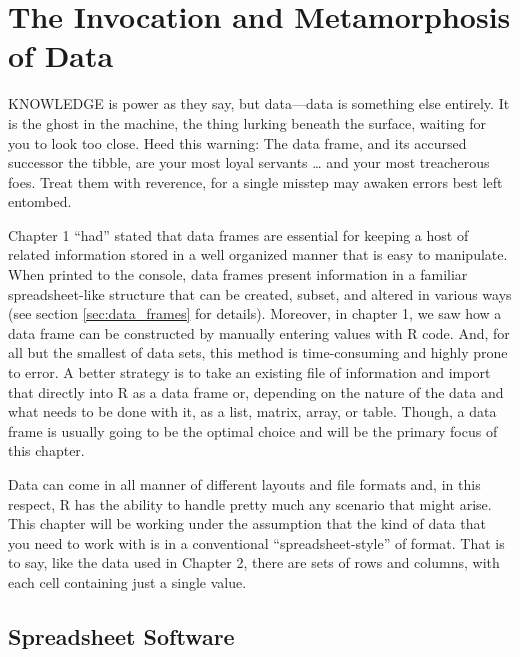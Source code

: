 \chapter{The Invocation and Metamorphosis of Data}

\IMFellEnglish
\lettrine[lines=5, realheight]{K}{NOWLEDGE} is power as they say, but data—data is something else entirely. It is the ghost in the machine, the thing lurking beneath the surface, waiting for you to look too close. Heed this warning: The data frame, and its accursed successor the tibble, are your most loyal servants \ldots{} and your most treacherous foes. Treat them with reverence, for a single misstep may awaken errors best left entombed.

\normalfont

Chapter 1 ``had'' stated that \glspl{data frame} are essential for keeping a host of related information stored in a well organized manner that is easy to manipulate. When printed to the console, data frames present information in a familiar spreadsheet-like structure that can be created, subset, and altered in various ways (see section \ref{sec:data_frames} for details). Moreover, in chapter 1, we saw how a data frame can be constructed by manually entering values with R code. And, for all but the smallest of data sets, this method is time-consuming and highly prone to error. A better strategy is to take an existing file of information and import that directly into R as a data frame or, depending on the nature of the data and what needs to be done with it, as a list, matrix, array, or table. Though, a data frame is usually going to be the optimal choice and will be the primary focus of this chapter.

Data can come in all manner of different layouts and file formats and, in this respect, R has the ability to handle pretty much any scenario that might arise. This chapter will be working under the assumption that the kind of data that you need to work with is in a conventional ``spreadsheet-style'' of format. That is to say, like the  data used in Chapter 2, there are sets of rows and columns, with each cell containing just a single value.

\section{Spreadsheet Software}
\label{sec:spreadsheet_soft}

